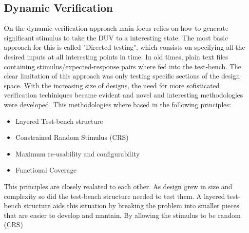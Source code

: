 \documentclass[a4paper,11pt]{article}
\begin{document}
\subsection{Dynamic Verification}
On the dynamic verification approach main focus relies on how to generate significant stimulus to take the DUV to a interesting state. The most basic approach for this is called "Directed testing", which consists on specifying all the desired inputs at all interesting points in time. In old times, plain text files containing stimulus/expected-response pairs where fed into the test-bench. The clear limitation of this approach was only testing specific sections of the design space. With the increasing size of designs, the need for more sofisticated verification techiniques became evident and novel and interesting methodologies were developed. This methodologies where based in the following principles:
\begin{itemize}
\item Layered Test-bench structure
\item Constrained Random Stimulus (CRS)
\item Maximum re-usability and configurability
\item Functional Coverage
\end{itemize}
%
%
This principles are closely realated to each other. As design grew in size and complexity so did the test-bench structure needed to test them. A layered test-bench structure aids this situation by breaking the problem into smaller pieces that are easier to develop and mantain. By allowing the stimulus to be random (CRS) 
\end{document}
